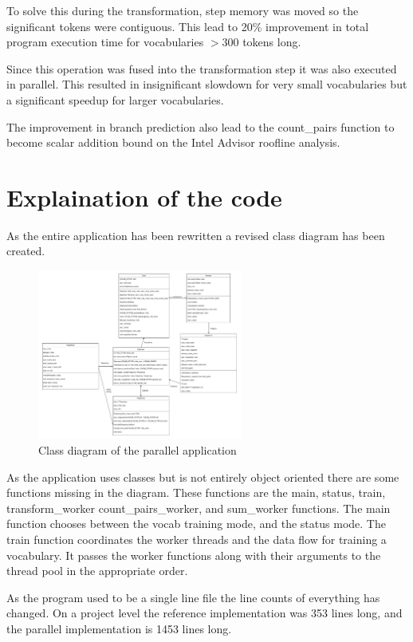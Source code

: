 \documentclass{article}
\begin{document}
To solve this during the transformation, step memory was moved so the significant tokens were contiguous. This 
lead to 20\% improvement in total program execution time for vocabularies $> 300$ tokens long.

Since this operation was fused into the transformation step it was also executed in parallel. This resulted in 
insignificant slowdown for very small vocabularies but a significant speedup for larger vocabularies. 

The improvement in branch prediction also lead to the count\_pairs function to become scalar addition bound on
the Intel Advisor roofline analysis.


\section{Explaination of the code}

As the entire application has been rewritten a revised class diagram has been created.

\begin{figure}[H]
    \centering
    \includegraphics[width=0.6\textwidth]{class_diagram.pdf}
    \caption{Class diagram of the parallel application}
\end{figure}

As the application uses classes but is not entirely object oriented there are some functions missing in the diagram.
These functions are the main, status, train, transform\_worker count\_pairs\_worker, and sum\_worker functions. 
The main function chooses between the vocab training mode, and the status mode. The train function coordinates
the worker threads and the data flow for training a vocabulary. It passes the worker functions along with their 
arguments to the thread pool in the appropriate order.

As the program used to be a single line file the line counts of everything has changed. On a project level
the reference implementation was 353 lines long, and the parallel implementation is 1453 lines long.
\end{document}
